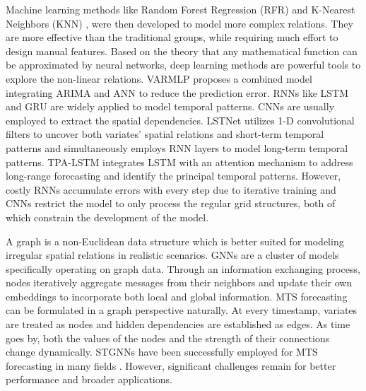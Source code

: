 \documentclass[final,12pt]{elsarticle}
\begin{document}
Machine learning methods like 
Random Forest Regression (RFR) \cite{breiman2001random} 
and K-Nearest Neighbors (KNN) \cite{regression1992introduction}, 
were then developed to model more complex relations.  %
They are more effective than the traditional groups, 
while requiring much effort to design manual features.  %
Based on the theory that any mathematical function can be approximated by neural networks, 
deep learning methods are powerful tools to explore the non-linear relations.  %
VARMLP \cite{zhang2003time} proposes a combined model 
integrating ARIMA and ANN 
to reduce the prediction error.  %
RNNs like LSTM \cite{graves2012long} and GRU \cite{cho2014learning} 
are widely applied to model temporal patterns.  %
CNNs \cite{lecun2002gradient} 
are usually employed to extract the spatial dependencies.  %
LSTNet \cite{lai2018modeling} utilizes 1-D convolutional filters 
to uncover both variates' spatial relations and short-term temporal patterns 
and simultaneously employs RNN layers to model long-term temporal patterns.  %
TPA-LSTM \cite{shih2019temporal} integrates LSTM 
with an attention mechanism 
to address long-range forecasting and 
identify the principal temporal patterns.  %
However, costly RNNs accumulate errors with every step due to iterative training 
and CNNs restrict the model to only process the regular grid structures, 
both of which constrain the development of the model.  %


A graph is a non-Euclidean data structure 
which is better suited for modeling irregular spatial relations in realistic scenarios.  %
GNNs \cite{bruna2013spectral}\cite{defferrard2016convolutional}\cite{kipf2016semi} 
are a cluster of models specifically operating on graph data.
Through an information exchanging process, 
nodes iteratively aggregate messages from their neighbors 
and update their own embeddings to incorporate both local and global information.  %
MTS forecasting can be formulated in a graph perspective naturally.
At every timestamp, variates are treated as nodes 
and hidden dependencies are established as edges.
As time goes by, both the values of the nodes and 
the strength of their connections change dynamically.  %
STGNNs have been successfully employed for MTS forecasting in many fields 
\cite{jin2023spatio}\cite{corradini2024systematic}.  %
However, significant challenges remain 
for better performance and broader applications.  %
\end{document}
